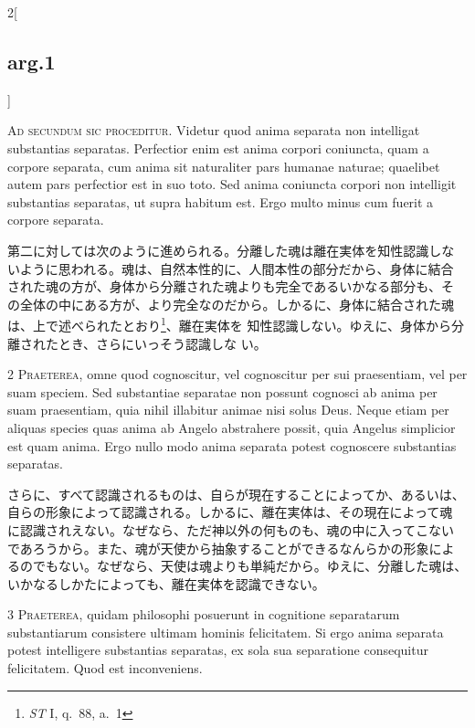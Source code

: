 \documentclass[paper=a4paper,fontsize=10pt,jafontsize=9pt,titlepage]{jlreq}
\begin{document}
\begin{paracol}{2}[\subsection{arg.1}]

{\huge A}{\scshape d secundum sic proceditur}. Videtur quod anima separata
non intelligat substantias separatas. Perfectior enim est anima
corpori coniuncta, quam a corpore separata, cum anima sit naturaliter
pars humanae naturae; quaelibet autem pars perfectior est in suo
toto. Sed anima coniuncta corpori non intelligit substantias
separatas, ut supra habitum est. Ergo multo minus cum fuerit a corpore
separata.

\switchcolumn

第二に対しては次のように進められる。分離した魂は離在実体を知性認識しな
いように思われる。魂は、自然本性的に、人間本性の部分だから、身体に結合
された魂の方が、身体から分離された魂よりも完全であるいかなる部分も、そ
の全体の中にある方が、より完全なのだから。しかるに、身体に結合された魂
は、上で述べられたとおり\footnote{{\itshape ST} I, q.~88, a.~1}、離在実体を
知性認識しない。ゆえに、身体から分離されたとき、さらにいっそう認識しな
い。

\switchcolumn*

2 {\scshape Praeterea}, omne quod cognoscitur, vel cognoscitur per sui
praesentiam, vel per suam speciem. Sed substantiae separatae non
possunt cognosci ab anima per suam praesentiam, quia nihil illabitur
animae nisi solus Deus. Neque etiam per aliquas species quas anima ab
Angelo abstrahere possit, quia Angelus simplicior est quam anima. Ergo
nullo modo anima separata potest cognoscere substantias separatas.

\switchcolumn

さらに、すべて認識されるものは、自らが現在することによってか、あるいは、
自らの形象によって認識される。しかるに、離在実体は、その現在によって魂
に認識されえない。なぜなら、ただ神以外の何ものも、魂の中に入ってこない
であろうから。また、魂が天使から抽象することができるなんらかの形象によ
るのでもない。なぜなら、天使は魂よりも単純だから。ゆえに、分離した魂は、
いかなるしかたによっても、離在実体を認識できない。

\switchcolumn*

3 {\scshape Praeterea}, quidam philosophi posuerunt in cognitione
separatarum substantiarum consistere ultimam hominis felicitatem. Si
ergo anima separata potest intelligere substantias separatas, ex sola
sua separatione consequitur felicitatem. Quod est inconveniens.


\end{paracol}
\end{document}
